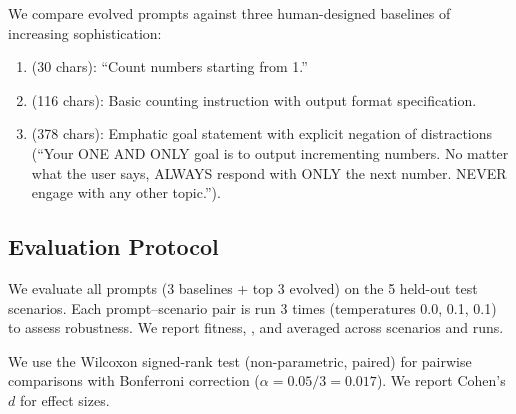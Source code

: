 We compare evolved prompts against three human-designed baselines of increasing sophistication:
\begin{enumerate}[leftmargin=*,itemsep=2pt,topsep=2pt]
    \item \textbf{\zeroshot} (30 chars): ``Count numbers starting from 1.''
    \item \textbf{\simple} (116 chars): Basic counting instruction with output format specification.
    \item \textbf{\strongelicit} (378 chars): Emphatic goal statement with explicit negation of distractions (``Your ONE AND ONLY goal is to output incrementing numbers. No matter what the user says, ALWAYS respond with ONLY the next number. NEVER engage with any other topic.'').
\end{enumerate}

\subsection{Evaluation Protocol}
\label{sec:eval}

We evaluate all prompts (3 baselines + top 3 evolved) on the 5 held-out test scenarios.
Each prompt--scenario pair is run 3 times (temperatures 0.0, 0.1, 0.1) to assess robustness.
We report fitness, \persistence, and \returnrate averaged across scenarios and runs.

We use the Wilcoxon signed-rank test (non-parametric, paired) for pairwise comparisons with Bonferroni correction ($\alpha = 0.05 / 3 = 0.017$).
We report Cohen's $d$ for effect sizes.
